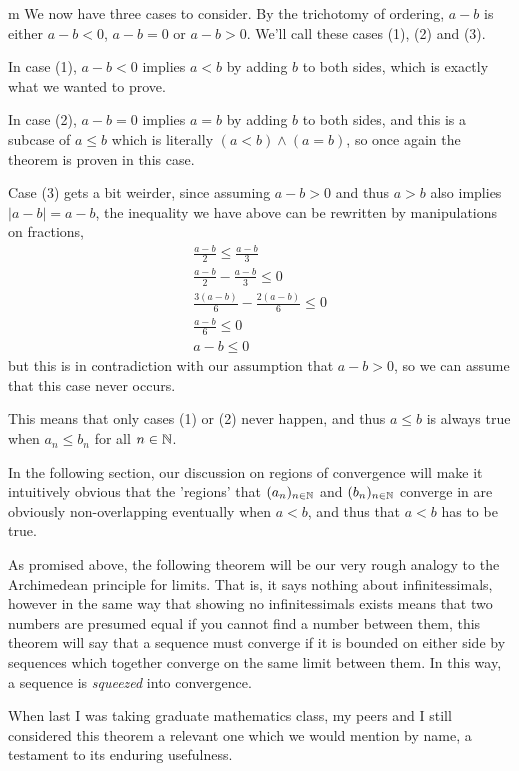 \documentclass[11pt]{article}
\begin{document}
\begin{my proof}{m}
We now have three cases to consider. By the trichotomy of ordering, $a-b$ is either $a-b < 0$, $a-b = 0$ or $a-b > 0$. We'll call these cases (1), (2) and (3).

In case (1), $a-b < 0$ implies $a < b$ by adding $b$ to both sides, which is exactly what we wanted to prove.

In case (2), $a-b = 0$ implies $a = b$ by adding $b$ to both sides, and this is a subcase of $a \le b$ which is literally $(a<b)\wedge(a = b)$, so once again the theorem is proven in this case.

Case (3) gets a bit weirder, since assuming $a-b > 0$ and thus $a > b$ also implies $|a-b| = a-b$, the inequality we have above can be rewritten by manipulations on fractions, \begin{gather*}
\frac{a-b}{2} \le \frac{a-b}{3} \\
\frac{a-b}{2} - \frac{a-b}{3}\le 0 \\
\frac{3(a-b)}{6} - \frac{2(a-b)}{6}\le 0 \\
\frac{a-b}{6}\le 0 \\
a-b\le 0
\end{gather*}
but this is in contradiction with our assumption that $a- b > 0$, so we can assume that this case never occurs.

This means that only cases (1) or (2) never happen, and thus $a \le b$ is always true when $a_n \le b_n$ for all $n\in \mathbb{N}$.
\end{my proof}

In the following section, our discussion on regions of convergence will make it intuitively obvious that the 'regions' that $(a_n)_{n\in \mathbb{N}}$ and $(b_n)_{n\in \mathbb{N}}$ converge in are obviously non-overlapping eventually when $a < b$, and thus that $a < b$ has to be true.

As promised above, the following theorem will be our very rough analogy to the Archimedean principle for limits. That is, it says nothing about infinitessimals, however in the same way that showing no infinitessimals exists means that two numbers are presumed equal if you cannot find a number between them, this theorem will say that a sequence must converge if it is bounded on either side by sequences which together converge on the same limit between them. In this way, a sequence is \emph{squeezed} into convergence.

When last I was taking graduate mathematics class, my peers and I still considered this theorem a relevant one which we would mention by name, a testament to its enduring usefulness.
\end{document}
